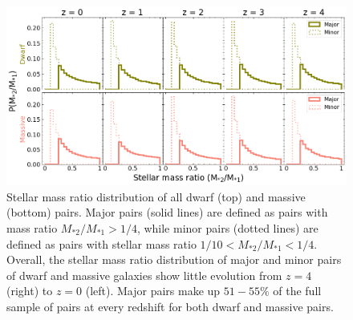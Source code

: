 \documentclass[twocolumn]{aastex631}
\newcommand{\ms}[1]{\ensuremath{M_{*{#1}}}}
\begin{document}
  \begin{figure}[htp]
    \centering
    \includegraphics[width=\textwidth]{smrdist_1000.png}
    \caption{Stellar mass ratio distribution of all dwarf (top) and massive (bottom) pairs. Major pairs (solid lines) are defined as pairs with mass ratio $\ms{2}/\ms{1} > 1/4$, while minor pairs (dotted lines) are defined as pairs with stellar mass ratio $1/10<\ms{2}/\ms{1}<1/4$. Overall, the stellar mass ratio distribution of major and minor pairs of dwarf and massive galaxies show little evolution from $z=4$ (right) to $z=0$ (left). 
    Major pairs make up $51-55\%$ of the full sample of pairs at every redshift for both dwarf and massive pairs.}
    \label{fig:massratio}
  \end{figure}

  
\end{document}

